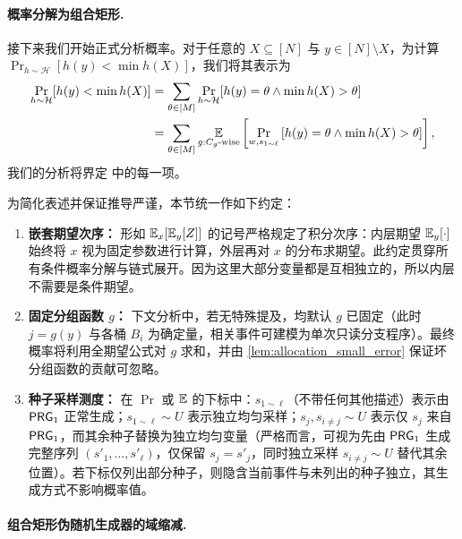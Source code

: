 \paragraph{概率分解为组合矩形.}

接下来我们开始正式分析概率。对于任意的 $X \subseteq [N]$ 与 $y \in [N] \setminus X$，为计算 $\Pr_{h \sim \mathcal{H}}[h(y)<\min h(X)]$，我们将其表示为
\begin{align}
    \Pr_{h \sim \mathcal{H}}[h(y) < \min h(X)] & = \sum_{\theta \in [M]} \Pr_{h \sim \mathcal{H}} [h(y)=\theta \wedge \min h(X)>\theta] \notag \\
      & = \sum_{\theta \in [M]} \operatorname*{\mathbb{E}}_{g : \text{$C_g$-wise}} \left[\Pr_{w, s_{1 \sim \ell}} \left[ h(y) = \theta \wedge \min h(X) > \theta \right]  \right], \label{eq:minwise_over_theta}
\end{align}
我们的分析将界定  中的每一项。

\begin{remark}
    为简化表述并保证推导严谨，本节统一作如下约定：
    \begin{enumerate}
        \item \textbf{嵌套期望次序：} 形如 $\operatorname*{\mathbb{E}}_x[\operatorname*{\mathbb{E}}_y[Z]]$ 的记号严格规定了积分次序：内层期望 $\operatorname*{\mathbb{E}}_y[\cdot]$ 始终将 $x$ 视为固定参数进行计算，外层再对 $x$ 的分布求期望。此约定贯穿所有条件概率分解与链式展开。因为这里大部分变量都是互相独立的，所以内层不需要是条件期望。

        \item \textbf{固定分组函数 $g$：} 下文分析中，若无特殊提及，均默认 $g$ 已固定（此时 $j=g(y)$ 与各桶 $B_i$ 为确定量，相关事件可建模为单次只读分支程序）。最终概率将利用全期望公式对 $g$ 求和，并由 \cref{lem:allocation_small_error} 保证坏分组函数的贡献可忽略。
        
        \item \textbf{种子采样测度：} 在 $\Pr$ 或 $\operatorname*{\mathbb{E}}$ 的下标中：$s_{1 \sim \ell}$（不带任何其他描述）表示由 $\mathsf{PRG}_1$ 正常生成；$s_{1 \sim \ell} \sim U$ 表示独立均匀采样；$s_j, s_{i \ne j} \sim U$ 表示仅 $s_j$ 来自 $\mathsf{PRG}_1$，而其余种子替换为独立均匀变量（严格而言，可视为先由 $\mathsf{PRG}_1$ 生成完整序列 $(s'_1,\ldots,s'_\ell)$，仅保留 $s_j = s'_j$，同时独立采样 $s_{i \ne j} \sim U$ 替代其余位置）。若下标仅列出部分种子，则隐含当前事件与未列出的种子独立，其生成方式不影响概率值。
    \end{enumerate}
\end{remark}

\paragraph{组合矩形伪随机生成器的域缩减.}


